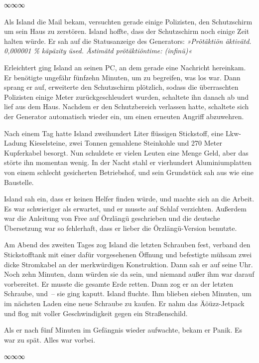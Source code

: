 \begin{center}
    ∞∞∞
\end{center}

Als Island die Mail bekam, versuchten gerade einige Polizisten, den Schutzschirm um sein Haus zu zerstören. Island hoffte, dass der Schutzschirm noch einige Zeit halten würde. Er sah auf die Statusanzeige des Generators: \textit{»Prötäktiön äktivätd. 0,000001 \% käpäzity üsed. Ästimätd prötäktiöntime: (infinü)«}

Erleichtert ging Island an seinen PC, an dem gerade eine Nachricht hereinkam. Er benötigte ungefähr fünfzehn Minuten, um zu begreifen, was los war. Dann sprang er auf, erweiterte den Schutzschirm plötzlich, sodass die überraschten Polizisten einige Meter zurückgeschleudert wurden, schaltete ihn danach ab und lief aus dem Haus. Nachdem er den Schutzbereich verlassen hatte, schaltete sich der Generator automatisch wieder ein, um einen erneuten Angriff abzuwehren.

Nach einem Tag hatte Island zweihundert Liter flüssigen Stickstoff, eine Lkw-Ladung Kieselsteine, zwei Tonnen gemahlene Steinkohle und 270 Meter Kupferkabel besorgt. Nun schuldete er vielen Leuten eine Menge Geld, aber das störte ihn momentan wenig. In der Nacht stahl er vierhundert Aluminiumplatten von einem schlecht gesicherten Betriebshof, und sein Grundstück sah aus wie eine Baustelle.

Island sah ein, dass er keinen Helfer finden würde, und machte sich an die Arbeit. Es war schwieriger als erwartet, und er musste auf Schlaf verzichten. Außerdem war die Anleitung von Free auf Örzlängü geschrieben und die deutsche Übersetzung war so fehlerhaft, dass er lieber die Örzlängü-Version benutzte.

Am Abend des zweiten Tages zog Island die letzten Schrauben fest, verband den Stickstofftank mit einer dafür vorgesehenen Öffnung und befestigte mühsam zwei dicke Stromkabel an der merkwürdigen Konstruktion. Dann sah er auf seine Uhr. Noch zehn Minuten, dann würden sie da sein, und niemand außer ihm war darauf vorbereitet. Er musste die gesamte Erde retten. Dann zog er an der letzten Schraube, und~– sie ging kaputt. Island fluchte. Ihm blieben sieben Minuten, um im nächsten Laden eine neue Schraube zu kaufen. Er nahm das Äöüzz-Jetpack und flog mit voller Geschwindigkeit gegen ein Straßenschild.

Als er nach fünf Minuten im Gefängnis wieder aufwachte, bekam er Panik. Es war zu spät. Alles war vorbei.

\begin{center}
    ∞∞∞
\end{center}

